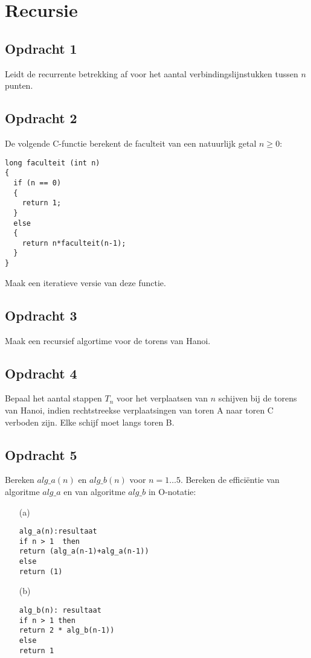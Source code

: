 \chapter{Recursie}
\section{Opdracht 1}
Leidt de recurrente betrekking af voor het aantal verbindingslijnstukken tussen $n$ punten.

\section{Opdracht 2}
De volgende C-functie berekent de faculteit van een natuurlijk getal $n\geq 0$:
\begin{lstlisting}
long faculteit (int n)
{
  if (n == 0)
  {
    return 1;
  }
  else
  {
    return n*faculteit(n-1);
  }
}
\end{lstlisting}
Maak een iteratieve versie van deze functie.

\section{Opdracht 3}
Maak een recursief algortime voor de torens van Hanoi.

\section{Opdracht 4}
Bepaal het aantal stappen $T_n$ voor het verplaatsen van $n$ schijven bij de torens van Hanoi, indien rechtstreekse verplaatsingen van toren A naar toren C verboden zijn. Elke schijf moet langs toren B.

\section{Opdracht 5}
Bereken $alg\_a(n)$ en $alg\_b(n)$ voor $n=1\ldots 5$. Bereken de effici\"{e}ntie van algoritme $alg\_a$ en van algoritme $alg\_b$ in O-notatie:
\begin{itemize}
\item[(a)]\begin{lstlisting}
alg_a(n):resultaat
if n > 1  then
return (alg_a(n-1)+alg_a(n-1))
else
return (1)
\end{lstlisting}
\item[(b)]\begin{lstlisting}
alg_b(n): resultaat
if n > 1 then
return 2 * alg_b(n-1))
else
return 1
\end{lstlisting}
\end{itemize}

